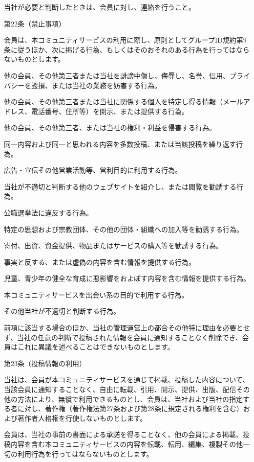         当社が必要と判断したときは、会員に対し、連絡を行うこと。

第22条（禁止事項）

    会員は、本コミュニティサービスの利用に際し、原則としてグループID規約第9条に従うほか、次に掲げる行為、もしくはそのおそれのある行為を行ってはならないものとします。

        他の会員、その他第三者または当社を誹謗中傷し、侮辱し、名誉、信用、プライバシーを毀損、または当社の業務を妨害する行為。

        他の会員、その他第三者または当社に関係する個人を特定し得る情報（メールアドレス、電話番号、住所等）を開示、または提供する行為。

        他の会員、その他第三者、または当社の権利・利益を侵害する行為。

        同一内容および同一と思われる内容を多数投稿、または当該投稿を繰り返す行為。

        広告・宣伝その他営業活動等、営利目的に利用する行為。

        当社が不適切と判断する他のウェブサイトを紹介し、または閲覧を勧誘する行為。

        公職選挙法に違反する行為。

        特定の思想および宗教団体、その他の団体・組織への加入等を勧誘する行為。

        寄付、出資、資金提供、物品またはサービスの購入等を勧誘する行為。

        事実と反する、または虚偽の内容を含む情報を提供する行為。

        児童、青少年の健全な育成に悪影響をおよぼす内容を含む情報を提供する行為。

        本コミュニティサービスを出会い系の目的で利用する行為。

        その他当社が不適切と判断する行為。

        前項に該当する場合のほか、当社の管理運営上の都合その他特に理由を必要とせず、当社の任意の判断で投稿された情報を会員に通知することなく削除でき、会員はこれに異議を述べることはできないものとします。

第23条（投稿情報の利用）

    当社は、会員が本コミュニティサービスを通じて掲載、投稿した内容について、当該会員に通知することなく、自由に転載、引用、開示、提供、出版、配信その他の方法により、無償で利用できるものとし、会員は、当社および当社の指定する者に対し、著作権（著作権法第27条および第28条に規定される権利を含む）および著作者人格権を行使しないものとします。

    会員は、当社の事前の書面による承諾を得ることなく、他の会員による掲載、投稿内容を含む本コミュニティサービスの内容を転載、転用、編集、複製その他一切の利用行為を行ってはならないものとします。


